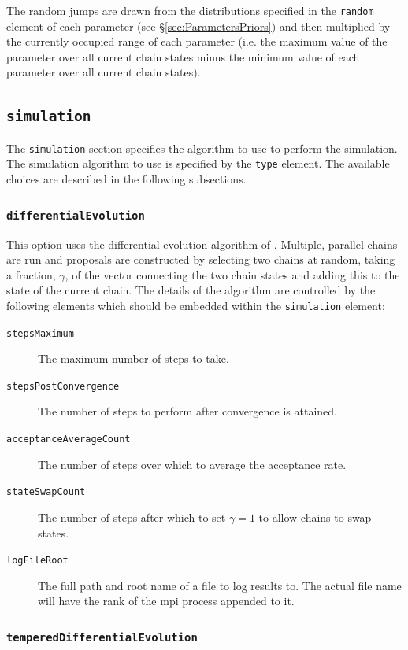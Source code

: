 The random jumps are drawn from the distributions specified in the {\tt random} element of each parameter (see \S\ref{sec:ParametersPriors}) and then multiplied by the currently occupied range of each parameter (i.e. the maximum value of the parameter over all current chain states minus the minimum value of each parameter over all current chain states).

\subsection{{\tt simulation}}

The {\tt simulation} section specifies the algorithm to use to perform the simulation. The simulation algorithm to use is specified by the {\tt type} element. The available choices are described in the following subsections.

\subsubsection{{\tt differentialEvolution}}

This option uses the differential evolution algorithm of \cite{terr_braak_markov_2006}. Multiple, parallel chains are run and proposals are constructed by selecting two chains at random, taking a fraction, $\gamma$, of the vector connecting the two chain states and adding this to the state of the current chain. The details of the algorithm are controlled by the following elements which should be embedded within the {\tt simulation} element:
\begin{description}
\item[{\tt stepsMaximum}] The maximum number of steps to take.
\item[{\tt stepsPostConvergence}] The number of steps to perform after convergence is attained.
\item[{\tt acceptanceAverageCount}] The number of steps over which to average the acceptance rate.
\item[{\tt stateSwapCount}] The number of steps after which to set $\gamma=1$ to allow chains to swap states.
\item[{\tt logFileRoot}] The full path and root name of a file to log results to. The actual file name will have the rank of the \gls{mpi} process appended to it.
\end{description}

\subsubsection{{\tt temperedDifferentialEvolution}}

